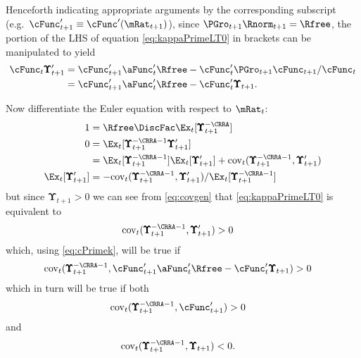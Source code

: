 \documentclass[./BufferStockTheory.tex]{subfiles}
\begin{document}
Henceforth indicating appropriate arguments by the corresponding
subscript (e.g.\ $\cFunc_{t+1}^{\prime} \equiv \cFunc^{\prime}(\mRat_{t+1})$), since
$\PGro_{t+1}\Rnorm_{t+1}=\Rfree$, the portion of the LHS of equation \eqref{eq:kappaPrimeLT0} in brackets can be manipulated to yield
\begin{align}
 \cFunc_{t} \pmb{\Upsilon}^{\prime}_{t+1}  & = \cFunc^{\prime}_{t+1}\aFunc^{\prime}_{t}\Rfree-\cFunc^{\prime}_{t} \PGro_{t+1} \cFunc_{t+1}/\cFunc_{t} \nonumber
\\  & = \cFunc^{\prime}_{t+1}\aFunc^{\prime}_{t}\Rfree-\cFunc^{\prime}_{t} \pmb{\Upsilon}_{t+1} \label{eq:cPrimek}
.
\end{align}

Now differentiate the Euler equation with respect to $\mRat_{t}$:
\begin{align}
  1  & = \Rfree \DiscFac \Ex_{t}[ \pmb{\Upsilon}_{t+1}^{-\CRRA}] \notag
\\ 0  & = \Ex_{t}[\pmb{\Upsilon}_{t+1}^{-\CRRA-1} \pmb{\Upsilon}_{t+1}^{\prime}] \notag
\\  & = \Ex_{t}[\pmb{\Upsilon}_{t+1}^{-\CRRA-1}]\Ex_{t}[\pmb{\Upsilon}_{t+1}^{\prime}]+\mbox{cov}_{t}(\pmb{\Upsilon}_{t+1}^{-\CRRA-1},\pmb{\Upsilon}_{t+1}^{\prime}) \notag
\\ \Ex_{t}[\pmb{\Upsilon}_{t+1}^{\prime}]  & = -\mbox{cov}_{t}(\pmb{\Upsilon}_{t+1}^{-\CRRA-1},\pmb{\Upsilon}_{t+1}^{\prime})/\Ex_{t}[\pmb{\Upsilon}_{t+1}^{-\CRRA-1}] \label{eq:covgen}
\end{align}
but since $\pmb{\Upsilon}_{t+1} > 0$ we can see from \eqref{eq:covgen} that \eqref{eq:kappaPrimeLT0} is equivalent to
\begin{align}
 \mbox{cov}_{t}(\pmb{\Upsilon}_{t+1}^{-\CRRA-1},\pmb{\Upsilon}_{t+1}^{\prime})  & > 0 \nonumber
\end{align}
which, using \eqref{eq:cPrimek}, will be true if
\begin{align}
 \mbox{cov}_{t}(\pmb{\Upsilon}_{t+1}^{-\CRRA-1},\cFunc^{\prime}_{t+1}\aFunc^{\prime}_{t}\Rfree - \cFunc^{\prime}_{t}\pmb{\Upsilon}_{t+1})  & > 0 \notag
\end{align}
which in turn will be true if both
\begin{align}
  \mbox{cov}_{t}(\pmb{\Upsilon}_{t+1}^{-\CRRA-1},\cFunc^{\prime}_{t+1} )  & > 0 \notag
\end{align}
and
\begin{align*}
  \mbox{cov}_{t}(\pmb{\Upsilon}_{t+1}^{-\CRRA-1},\pmb{\Upsilon}_{t+1})  & < 0. \notag
\end{align*}
\end{document}
